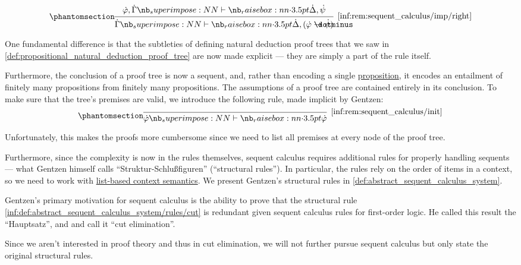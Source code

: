 \begin{remark}
\begin{paracol}{2}
    \begin{rightcolumn}
      \ParacolAlignmentHack
      \begin{equation}\taglabel[\ensuremath{ \rightarrow_R }]{inf:rem:sequent_calculus/imp/right}
        \begin{prooftree}
          \hypo{ \syn\varphi, \syn\Gamma \synvdash \syn\Delta, \syn\psi }
          \infer1[\ref{inf:rem:sequent_calculus/imp/right}]{ \syn\Gamma \synvdash \syn\Delta, (\syn\varphi \synimplies \syn\psi) }
        \end{prooftree}
      \end{equation}
    \end{rightcolumn}
  \end{paracol}

  One fundamental difference is that the subtleties of defining natural deduction proof trees that we saw in \cref{def:propositional_natural_deduction_proof_tree} are now made explicit --- they are simply a part of the rule itself.

  Furthermore, the conclusion of a proof tree is now a sequent, and, rather than encoding a single \hyperref[con:proposition]{proposition}, it encodes an entailment of finitely many propositions from finitely many propositions. The assumptions of a proof tree are contained entirely in its conclusion. To make sure that the tree's premises are valid, we introduce the following rule, made implicit by Gentzen:
  \begin{equation*}\taglabel[\ensuremath{ \logic{Init} }]{inf:rem:sequent_calculus/init}
    \begin{prooftree}
      \infer0[\ref{inf:rem:sequent_calculus/init}]{ \syn\varphi \synvdash \syn\varphi }.
    \end{prooftree}
  \end{equation*}

  Unfortunately, this makes the proofs more cumbersome since we need to list all premises at every node of the proof tree.

  Furthermore, since the complexity is now in the rules themselves, sequent calculus requires additional rules for properly handling sequents --- what Gentzen himself calls \enquote{Struktur-Schlu\ss{}figuren} (\enquote{structural rules}). In particular, the rules rely on the order of items in a context, so we need to work with \hyperref[def:logical_context_semantics]{list-based context semantics}. We present Gentzen's structural rules in \cref{def:abstract_sequent_calculus_system}.

  Gentzen's primary motivation for sequent calculus is the ability to prove that the structural rule \ref{inf:def:abstract_sequent_calculus_system/rules/cut} is redundant given sequent calculus rules for first-order logic. He called this result the \enquote{Hauptsatz}, and  and  call it \enquote{cut elimination}.

  Since we aren't interested in proof theory and thus in cut elimination, we will not further pursue sequent calculus but only state the original structural rules.
\end{remark}

